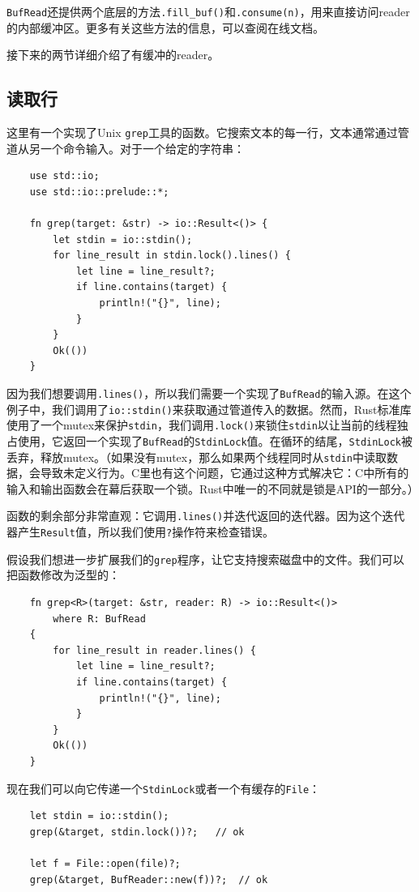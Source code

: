 \texttt{BufRead}还提供两个底层的方法\texttt{.fill\_buf()}和\texttt{.consume(n)}，用来直接访问reader的内部缓冲区。更多有关这些方法的信息，可以查阅在线文档。

接下来的两节详细介绍了有缓冲的reader。

\subsection{读取行}\label{ReadLines}
这里有一个实现了Unix \texttt{grep}工具的函数。它搜索文本的每一行，文本通常通过管道从另一个命令输入。对于一个给定的字符串：
\begin{verbatim}
    use std::io;
    use std::io::prelude::*;

    fn grep(target: &str) -> io::Result<()> {
        let stdin = io::stdin();
        for line_result in stdin.lock().lines() {
            let line = line_result?;
            if line.contains(target) {
                println!("{}", line);
            }
        }
        Ok(())
    }
\end{verbatim}

因为我们想要调用\texttt{.lines()}，所以我们需要一个实现了\texttt{BufRead}的输入源。在这个例子中，我们调用了\texttt{io::stdin()}来获取通过管道传入的数据。然而，Rust标准库使用了一个mutex来保护\texttt{stdin}，我们调用\texttt{.lock()}来锁住\texttt{stdin}以让当前的线程独占使用，它返回一个实现了\texttt{BufRead}的\texttt{StdinLock}值。在循环的结尾，\texttt{StdinLock}被丢弃，释放mutex。（如果没有mutex，那么如果两个线程同时从\texttt{stdin}中读取数据，会导致未定义行为。C里也有这个问题，它通过这种方式解决它：C中所有的输入和输出函数会在幕后获取一个锁。Rust中唯一的不同就是锁是API的一部分。）

函数的剩余部分非常直观：它调用\texttt{.lines()}并迭代返回的迭代器。因为这个迭代器产生\texttt{Result}值，所以我们使用\texttt{?}操作符来检查错误。

假设我们想进一步扩展我们的\texttt{grep}程序，让它支持搜索磁盘中的文件。我们可以把函数修改为泛型的：
\begin{verbatim}
    fn grep<R>(target: &str, reader: R) -> io::Result<()>
        where R: BufRead
    {
        for line_result in reader.lines() {
            let line = line_result?;
            if line.contains(target) {
                println!("{}", line);
            }
        }
        Ok(())
    }
\end{verbatim}

现在我们可以向它传递一个\texttt{StdinLock}或者一个有缓存的\texttt{File}：
\begin{verbatim}
    let stdin = io::stdin();
    grep(&target, stdin.lock())?;   // ok

    let f = File::open(file)?;
    grep(&target, BufReader::new(f))?;  // ok
\end{verbatim}

